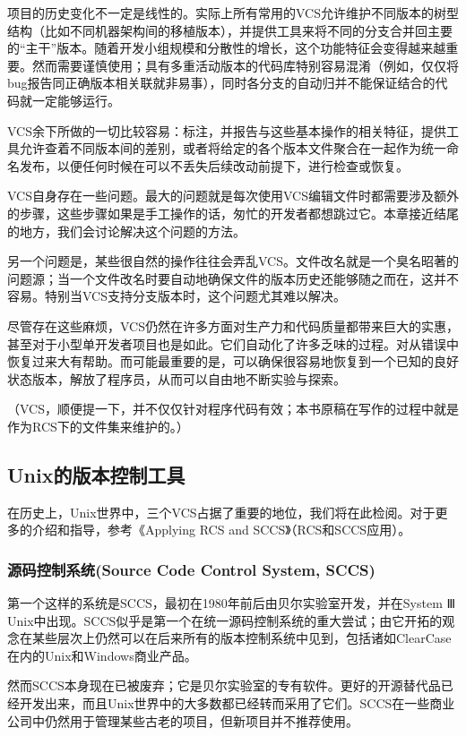 \documentclass[12pt,oneside]{book}
\begin{document}
\begin{common-format}
项目的历史变化不一定是线性的。实际上所有常用的VCS允许维护不同版本的树型结构（比如不同机器架构间的移植版本），并提供工具来将不同的分支合并回主要的“主干”版本。随着开发小组规模和分散性的增长，这个功能特征会变得越来越重要。然而需要谨慎使用；具有多重活动版本的代码库特别容易混淆（例如，仅仅将bug报告同正确版本相关联就非易事），同时各分支的自动归并不能保证结合的代码就一定能够运行。

VCS余下所做的一切比较容易：标注，并报告与这些基本操作的相关特征，提供工具允许查着不同版本间的差别，或者将给定的各个版本文件聚合在一起作为统一命名发布，以便任何时候在可以不丢失后续改动前提下，进行检查或恢复。

VCS自身存在一些问题。最大的问题就是每次使用VCS编辑文件时都需要涉及额外的步骤，这些步骤如果是手工操作的话，匆忙的开发者都想跳过它。本章接近结尾的地方，我们会讨论解决这个问题的方法。

另一个问题是，某些很自然的操作往往会弄乱VCS。文件改名就是一个臭名昭著的问题源；当一个文件改名时要自动地确保文件的版本历史还能够随之而在，这并不容易。特别当VCS支持分支版本时，这个问题尤其难以解决。

尽管存在这些麻烦，VCS仍然在许多方面对生产力和代码质量都带来巨大的实惠，甚至对于小型单开发者项目也是如此。它们自动化了许多乏味的过程。对从错误中恢复过来大有帮助。而可能最重要的是，可以确保很容易地恢复到一个已知的良好状态版本，解放了程序员，从而可以自由地不断实验与探索。

（VCS，顺便提一下，并不仅仅针对程序代码有效；本书原稿在写作的过程中就是作为RCS下的文件集来维护的。）

\subsection{Unix的版本控制工具}
在历史上，Unix世界中，三个VCS占据了重要的地位，我们将在此检阅。对于更多的介绍和指导，参考《Applying RCS and SCCS》（RCS和SCCS应用）\cite{Bolinger-Bronson}。

\subsubsection{源码控制系统(Source Code Control System, SCCS)}
第一个这样的系统是SCCS，最初在1980年前后由贝尔实验室开发，并在System Ⅲ Unix中出现。SCCS似乎是第一个在统一源码控制系统的重大尝试；由它开拓的观念在某些层次上仍然可以在后来所有的版本控制系统中见到，包括诸如ClearCase在内的Unix和Windows商业产品。

然而SCCS本身现在已被废弃；它是贝尔实验室的专有软件。更好的开源替代品已经开发出来，而且Unix世界中的大多数都已经转而采用了它们。SCCS在一些商业公司中仍然用于管理某些古老的项目，但新项目并不推荐使用。


\end{common-format}
\end{document}
